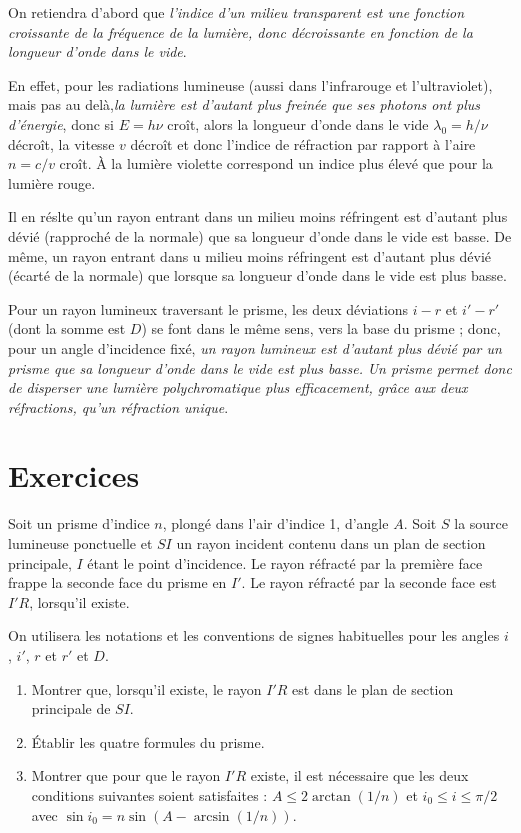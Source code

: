On retiendra d'abord que \emph{l'indice d'un milieu transparent est une fonction croissante de la fréquence de la lumière, donc décroissante en fonction de la longueur d'onde dans le vide}.

En effet, pour les radiations lumineuse (aussi dans l'infrarouge et l'ultraviolet), mais pas au delà,\emph{la lumière est d'autant plus freinée que ses photons ont plus d'énergie}, donc si $E=h \nu$ croît, alors la longueur d'onde dans le vide $\lambda_0 = h/\nu$ décroît, la vitesse $v$ décroît et donc l'indice de réfraction par rapport à l'aire $n=c/v$ croît. À la lumière violette correspond un indice plus élevé que pour la lumière rouge.

Il en réslte qu'un rayon entrant dans un milieu moins réfringent est d'autant plus dévié (rapproché de la normale) que sa longueur d'onde dans le vide est basse. De même, un rayon entrant dans u milieu moins réfringent est d'autant plus dévié (écarté de la normale) que lorsque sa longueur d'onde dans le vide est plus basse.

Pour un rayon lumineux traversant le prisme, les deux déviations $i-r$ et $i'-r'$ (dont la somme est $D$) se font dans le même sens, vers la base du prisme ; donc, pour un angle d'incidence fixé, \emph{un rayon lumineux est d'autant plus dévié par un prisme que sa longueur d'onde dans le vide est plus basse.}
\emph{Un prisme permet donc de disperser une lumière polychromatique plus efficacement, grâce aux deux réfractions, qu'un réfraction unique}.

\section{Exercices}

\begin{exercice}
	Soit un prisme d'indice $n$, plongé dans l'air d'indice 1, d'angle $A$.
	Soit $S$ la source lumineuse ponctuelle et $SI$ un rayon incident contenu dans un plan de section principale, $I$ étant le point d'incidence. Le rayon réfracté par la première face frappe la seconde face du prisme en $I'$. Le rayon réfracté par la seconde face est $I'R$, lorsqu'il existe.

	On utilisera les notations et les conventions de signes habituelles pour les angles $i$, $i'$, $r$ et $r'$ et $D$.
	\begin{enumerate}
\item Montrer que, lorsqu'il existe, le rayon $I'R$ est dans le plan de section principale de $SI$.
\item Établir les quatre formules du prisme.
\item Montrer que pour que le rayon $I'R$ existe, il est nécessaire que les deux conditions suivantes soient satisfaites : $A \leq 2 \arctan(1/n)$ et $i_0 \leq i \leq \pi/2$ avec $\sin i_0 = n \sin\left(A-\arcsin(1/n)\right)$.
	\end{enumerate}
\end{exercice}

